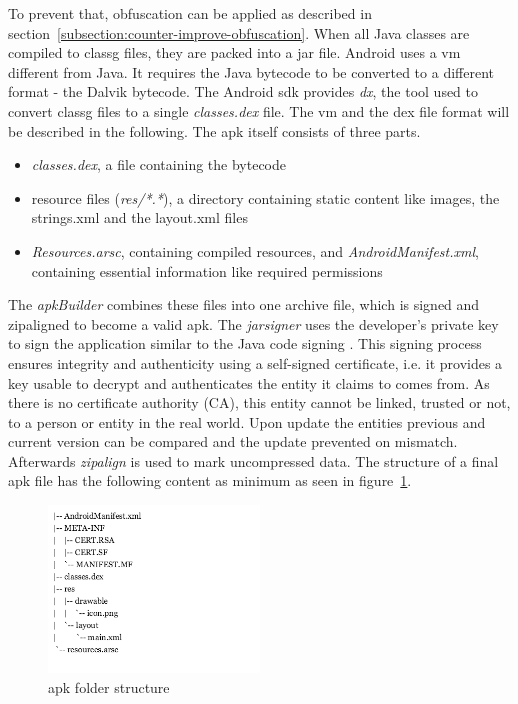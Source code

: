 To prevent that, obfuscation can be applied as described in section~\ref{subsection:counter-improve-obfuscation}.
When all Java classes are compiled to \gls{classg} files, they are packed into a \gls{jar} file.
\newline
Android uses a \gls{vm} different from Java.
It requires the Java bytecode to be converted to a different format - the Dalvik bytecode.
The Android \gls{sdk} provides \textit{dx}, the tool used to convert \gls{classg} files to a single \textit{classes.dex} file.
The \gls{vm} and the \gls{dex} file format will be described in the following.
\newline
The \gls{apk} itself consists of three parts.
\begin{itemize}
\item \textit{classes.dex}, a file containing the bytecode
\item resource files (\textit{res/*.*}), a directory containing static content like images, the strings.xml and the layout.xml files
\item \textit{Resources.arsc}, containing compiled resources, and \textit{AndroidManifest.xml}, containing essential information like required permissions
\end{itemize}
The \textit{apkBuilder} combines these files into one archive file, which is signed and zipaligned to become a valid \gls{apk}.
The \textit{jarsigner} uses the developer’s private key to sign the application similar to the Java code signing \cite{codeSigning}.
This signing process ensures integrity and authenticity using a self-signed certificate, i.e. it provides a key usable to decrypt and authenticates the entity it claims to comes from.
As there is no certificate authority (CA), this entity cannot be linked, trusted or not, to a person or entity in the real world.
Upon update the entities previous and current version can be compared and the update prevented on mismatch.
Afterwards \textit{zipalign} is used to mark uncompressed data. \cite{androidPublishSign} \cite{androidSigning} \cite{andevconDalvikART}
\newline
\newline
The structure of a final \gls{apk} file has the following content as minimum as seen in figure~\ref{fig:apkfolder}.
\begin{figure}[h]
    \centering
    \includegraphics[width=0.5\textwidth]{data/apkfolder.png}
    \caption{\gls{apk} folder structure}
    \label{fig:apkfolder}
\end{figure}
